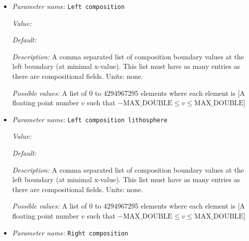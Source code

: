 \begin{itemize}
{\it Possible values:} A list of 0 to 4294967295 elements where each element is [A floating point number $v$ such that $-\text{MAX\_DOUBLE} \leq v \leq \text{MAX\_DOUBLE}$]
\item {\it Parameter name:} {\tt Left composition}
\label{parameters:Boundary composition model/Box with lithosphere boundary indicators/Left composition}
\label{parameters:Boundary_20composition_20model/Box_20with_20lithosphere_20boundary_20indicators/Left_20composition}


{\it Value:} 


{\it Default:} 


{\it Description:} A comma separated list of composition boundary values at the left boundary (at minimal x-value). This list must have as many entries as there are compositional fields. Units: none.


{\it Possible values:} A list of 0 to 4294967295 elements where each element is [A floating point number $v$ such that $-\text{MAX\_DOUBLE} \leq v \leq \text{MAX\_DOUBLE}$]
\item {\it Parameter name:} {\tt Left composition lithosphere}
\label{parameters:Boundary composition model/Box with lithosphere boundary indicators/Left composition lithosphere}
\label{parameters:Boundary_20composition_20model/Box_20with_20lithosphere_20boundary_20indicators/Left_20composition_20lithosphere}


{\it Value:} 


{\it Default:} 


{\it Description:} A comma separated list of composition boundary values at the left boundary (at minimal x-value). This list must have as many entries as there are compositional fields. Units: none.


{\it Possible values:} A list of 0 to 4294967295 elements where each element is [A floating point number $v$ such that $-\text{MAX\_DOUBLE} \leq v \leq \text{MAX\_DOUBLE}$]
\item {\it Parameter name:} {\tt Right composition}
\label{parameters:Boundary composition model/Box with lithosphere boundary indicators/Right composition}
\label{parameters:Boundary_20composition_20model/Box_20with_20lithosphere_20boundary_20indicators/Right_20composition}



\end{itemize}
